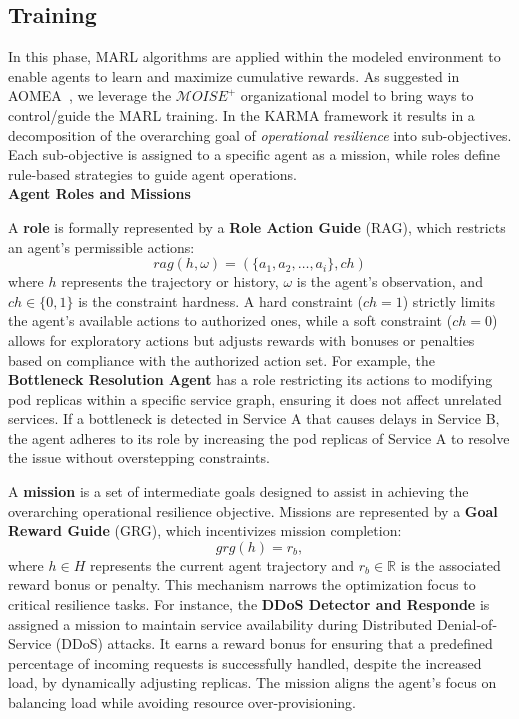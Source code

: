 \documentclass[conference]{IEEEtran}
\begin{document}
\subsection{Training}
\label{sec:training}

In this phase, MARL algorithms are applied within the modeled environment to enable agents to learn and maximize cumulative rewards. As suggested in AOMEA~\cite{soule2024aomea}, we leverage the $\mathcal{M}OISE^+$ organizational model to bring ways to control/guide the MARL training. In the KARMA framework it results in a decomposition of the overarching goal of \textit{operational resilience} into sub-objectives. Each sub-objective is assigned to a specific agent as a mission, while roles define rule-based strategies to guide agent operations.\\

\noindent \textbf{Agent Roles and Missions}

A \textbf{role} is formally represented by a \textbf{Role Action Guide} (RAG), which restricts an agent's permissible actions:
$$
rag(h, \omega) = (\{a_1, a_2, \dots, a_i\}, ch)
$$
where $h$ represents the trajectory or history, \(\omega\) is the agent's observation, and \(ch \in \{0,1\}\) is the constraint hardness. A hard constraint (\(ch = 1\)) strictly limits the agent's available actions to authorized ones, while a soft constraint (\(ch = 0\)) allows for exploratory actions but adjusts rewards with bonuses or penalties based on compliance with the authorized action set. For example, the \textbf{Bottleneck Resolution Agent} has a role restricting its actions to modifying pod replicas within a specific service graph, ensuring it does not affect unrelated services. If a bottleneck is detected in Service A that causes delays in Service B, the agent adheres to its role by increasing the pod replicas of Service A to resolve the issue without overstepping constraints.

A \textbf{mission} is a set of intermediate goals designed to assist in achieving the overarching operational resilience objective. Missions are represented by a \textbf{Goal Reward Guide} (GRG), which incentivizes mission completion:
$$
grg(h) = r_b,
$$
where \(h \in H\) represents the current agent trajectory and \(r_b \in \mathbb{R}\) is the associated reward bonus or penalty. This mechanism narrows the optimization focus to critical resilience tasks. For instance, the \textbf{DDoS Detector and Responde} is assigned a mission to maintain service availability during Distributed Denial-of-Service (DDoS) attacks. It earns a reward bonus for ensuring that a predefined percentage of incoming requests is successfully handled, despite the increased load, by dynamically adjusting replicas. The mission aligns the agent's focus on balancing load while avoiding resource over-provisioning.\\
\end{document}
